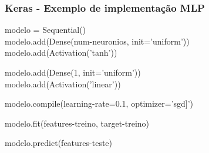 \documentclass[11pt]{beamer}
\begin{document}
    \begin{frame}
      \frametitle{Keras - Exemplo de implementação MLP}

      
      modelo = Sequential() \\
      modelo.add(Dense(num-neuronios, init='uniform'))\\
      modelo.add(Activation('tanh')) \newline

      modelo.add(Dense(1, init='uniform')) \\
      modelo.add(Activation('linear')) \newline

      modelo.compile(learning-rate=0.1, optimizer='sgd]') \newline

      modelo.fit(features-treino, target-treino) \newline

      modelo.predict(features-teste)
     
    \end{frame} 
    
\end{document}
